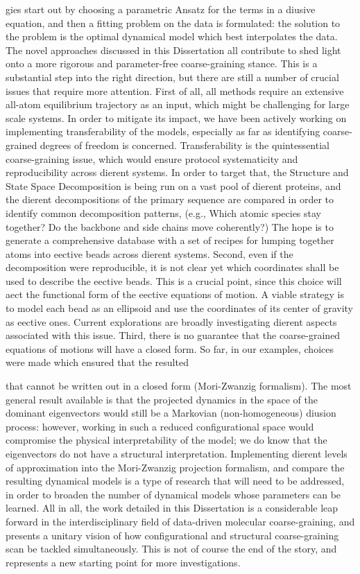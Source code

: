 gies start out by choosing a parametric Ansatz for the terms in a diusive equation, and
then a fitting problem on the data is formulated: the solution to the problem is the optimal
dynamical model which best interpolates the data.
The novel approaches discussed in this Dissertation all contribute to shed light onto a
more rigorous and parameter-free coarse-graining stance. This is a substantial step into the
right direction, but there are still a number of crucial issues that require more attention.
First of all, all methods require an extensive all-atom equilibrium trajectory as an input,
which might be challenging for large scale systems. In order to mitigate its impact,
we have been actively working on implementing transferability of the models, especially
as far as identifying coarse-grained degrees of freedom is concerned. Transferability is the
quintessential coarse-graining issue, which would ensure protocol systematicity and reproducibility
across dierent systems. In order to target that, the Structure and State Space
Decomposition is being run on a vast pool of dierent proteins, and the dierent decompositions
of the primary sequence are compared in order to identify common decomposition
patterns, (e.g., Which atomic species stay together? Do the backbone and side chains move
coherently?) The hope is to generate a comprehensive database with a set of recipes for
lumping together atoms into eective beads across dierent systems.
Second, even if the decomposition were reproducible, it is not clear yet which coordinates
shall be used to describe the eective beads. This is a crucial point, since this choice will
aect the functional form of the eective equations of motion. A viable strategy is to model
each bead as an ellipsoid and use the coordinates of its center of gravity as eective ones.
Current explorations are broadly investigating dierent aspects associated with this issue.
Third, there is no guarantee that the coarse-grained equations of motions will have a
closed form. So far, in our examples, choices were made which ensured that the resulted




that cannot be written out in a closed form (Mori-Zwanzig formalism). The most general
result available is that the projected dynamics in the space of the dominant eigenvectors
would still be a Markovian (non-homogeneous) diusion process: however, working in such a
reduced configurational space would compromise the physical interpretability of the model;
we do know that the eigenvectors do not have a structural interpretation. Implementing
dierent levels of approximation into the Mori-Zwanzig projection formalism, and compare
the resulting dynamical models is a type of research that will need to be addressed, in order
to broaden the number of dynamical models whose parameters can be learned.
All in all, the work detailed in this Dissertation is a considerable leap forward in the
interdisciplinary field of data-driven molecular coarse-graining, and presents a unitary vision
of how configurational and structural coarse-graining scan be tackled simultaneously. This is
not of course the end of the story, and represents a new starting point for more investigations.